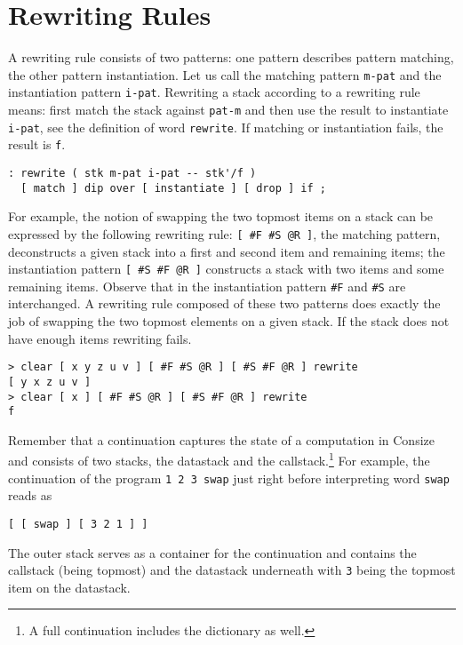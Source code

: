\section{Rewriting Rules}

A rewriting rule consists of two patterns: one pattern describes pattern matching, the other pattern instantiation. Let us call the matching pattern \verb|m-pat| and the instantiation pattern \verb|i-pat|. 
Rewriting a stack according to a rewriting rule means: first match the stack against \verb|pat-m| and then use the result to instantiate \verb|i-pat|, see the definition of word \verb|rewrite|. If matching or instantiation fails, the result is \verb|f|.

\begin{verbatim}
: rewrite ( stk m-pat i-pat -- stk'/f )
  [ match ] dip over [ instantiate ] [ drop ] if ;
\end{verbatim}

For example, the notion of swapping the two topmost items on a stack can be expressed by the following rewriting rule: \verb|[ #F #S @R ]|, the matching pattern, deconstructs a given stack into a first and second item and remaining items; the instantiation pattern \verb|[ #S #F @R ]| constructs a stack with two items and some remaining items. Observe that in the instantiation pattern \verb|#F| and \verb|#S| are interchanged. A rewriting rule composed of these two patterns does exactly the job of swapping the two topmost elements on a given stack. If the stack does not have enough items rewriting fails.

\begin{verbatim}
> clear [ x y z u v ] [ #F #S @R ] [ #S #F @R ] rewrite
[ y x z u v ]
> clear [ x ] [ #F #S @R ] [ #S #F @R ] rewrite
f
\end{verbatim}

Remember that a continuation captures the state of a computation in Consize and consists of two stacks, the datastack and the callstack.\footnote{A full continuation includes the dictionary as well.} For example, the continuation of the program \verb|1 2 3 swap| just right before interpreting word \verb|swap| reads as

\begin{verbatim}
[ [ swap ] [ 3 2 1 ] ]
\end{verbatim}

The outer stack serves as a container for the continuation and contains the callstack (being topmost) and the datastack underneath with \verb|3| being the topmost item on the datastack.

